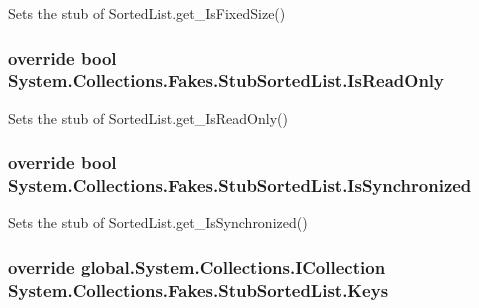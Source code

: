 Sets the stub of Sorted\-List.\-get\-\_\-\-Is\-Fixed\-Size()

\hypertarget{class_system_1_1_collections_1_1_fakes_1_1_stub_sorted_list_a3aa357d218e70f0f8dd9a6261c77af1f}{
\subsubsection[{Is\-Read\-Only}]{\setlength{\rightskip}{0pt plus 5cm}override bool System.\-Collections.\-Fakes.\-Stub\-Sorted\-List.\-Is\-Read\-Only\hspace{0.3cm}{\ttfamily [get]}}}\label{class_system_1_1_collections_1_1_fakes_1_1_stub_sorted_list_a3aa357d218e70f0f8dd9a6261c77af1f}


Sets the stub of Sorted\-List.\-get\-\_\-\-Is\-Read\-Only()

\hypertarget{class_system_1_1_collections_1_1_fakes_1_1_stub_sorted_list_a9dab3e019bf7cae5116d432f5425c8c4}{
\subsubsection[{Is\-Synchronized}]{\setlength{\rightskip}{0pt plus 5cm}override bool System.\-Collections.\-Fakes.\-Stub\-Sorted\-List.\-Is\-Synchronized\hspace{0.3cm}{\ttfamily [get]}}}\label{class_system_1_1_collections_1_1_fakes_1_1_stub_sorted_list_a9dab3e019bf7cae5116d432f5425c8c4}


Sets the stub of Sorted\-List.\-get\-\_\-\-Is\-Synchronized()

\hypertarget{class_system_1_1_collections_1_1_fakes_1_1_stub_sorted_list_ac7c95bd264750187e856cf919e6c054e}{
\subsubsection[{Keys}]{\setlength{\rightskip}{0pt plus 5cm}override global.\-System.\-Collections.\-I\-Collection System.\-Collections.\-Fakes.\-Stub\-Sorted\-List.\-Keys\hspace{0.3cm}{\ttfamily [get]}}}\label{class_system_1_1_collections_1_1_fakes_1_1_stub_sorted_list_ac7c95bd264750187e856cf919e6c054e}


